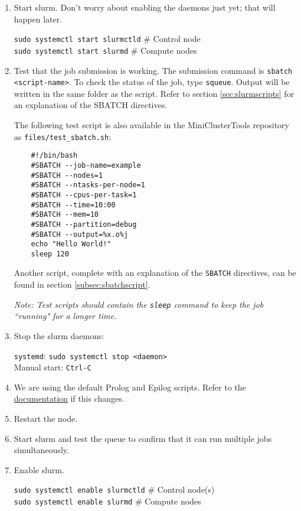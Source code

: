 \begin{enumerate}
  \item Start slurm. Don't worry about enabling the daemons just yet; that will happen later.

    \texttt{sudo systemctl start slurmctld} \quad \# Control node \\
    \texttt{sudo systemctl start slurmd} \quad \# Compute nodes 

  \item Test that the job submission is working. The submission command is \texttt{sbatch <script-name>}. To check the status of the job, type \texttt{squeue}. Output will be written in the same folder as the script. Refer to section \ref{sec:slurmscripts} for an explanation of the SBATCH directives.

    The following test script is also available in the MiniClusterTools repository as \texttt{files/test\_sbatch.sh}:
	\begin{verbatim}
	#!/bin/bash
	#SBATCH --job-name=example
	#SBATCH --nodes=1
	#SBATCH --ntasks-per-node=1
	#SBATCH --cpus-per-task=1
	#SBATCH --time=10:00
	#SBATCH --mem=10
	#SBATCH --partition=debug
	#SBATCH --output=%x.o%j
	echo "Hello World!"
	sleep 120
	\end{verbatim}

    Another script, complete with an explanation of the \texttt{SBATCH} directives, can be found in section \ref{subsec:sbatchscript}.

    \emph{Note: Test scripts should contain the \emph{\texttt{sleep}} command to keep the job ``running" for a longer time.}

  \item Stop the slurm daemons: 

    \texttt{systemd}: \texttt{sudo systemctl stop <daemon>} \\
    Manual start: \texttt{Ctrl-C}

  \item We are using the default Prolog and Epilog scripts. Refer to the \href{https://slurm.schedmd.com/slurm.conf.html}{documentation} if this changes.

  \item Restart the node.
	
  \item Start slurm and test the queue to confirm that it can run multiple jobs simultaneously.

  \item Enable slurm.

    \texttt{sudo systemctl enable slurmctld} \quad \# Control node(s) \\
    \texttt{sudo systemctl enable slurmd} \quad \# Compute nodes 
\end{enumerate}

